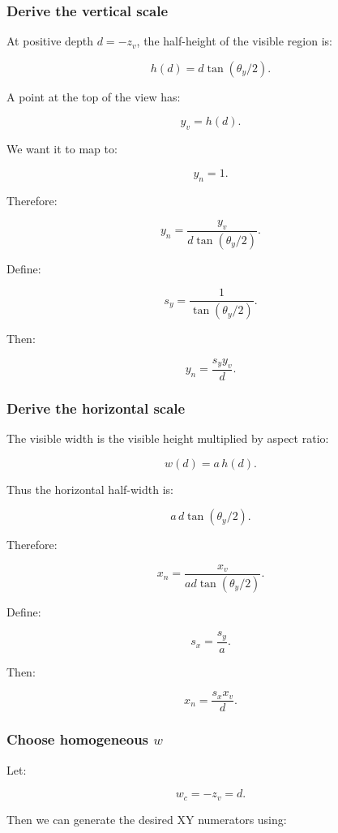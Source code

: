 \subsubsection{Derive the vertical scale}\label{derive-the-vertical-scale}

At positive depth \(d=-z_v\), the half-height of the visible region is:

\[
 h(d)=d\tan(\theta_y/2).
\]

A point at the top of the view has:

\[
 y_v=h(d).
\]

We want it to map to:

\[
 y_n=1.
\]

Therefore:

\[
 y_n= \frac{y_v}{d\tan(\theta_y/2)}.
\]

Define:

\[
 \boxed{ s_y=\frac1{\tan(\theta_y/2)} }.
\]

Then:

\[
 \boxed{ y_n=\frac{s_yy_v}{d} }.
\]

\subsubsection{Derive the horizontal scale}\label{derive-the-horizontal-scale}

The visible width is the visible height multiplied by aspect ratio:

\[
 w(d)=a\,h(d).
\]

Thus the horizontal half-width is:

\[
 a\,d\tan(\theta_y/2).
\]

Therefore:

\[
 \boxed{ x_n= \frac{x_v}{ad\tan(\theta_y/2)} }.
\]

Define:

\[
 \boxed{ s_x=\frac{s_y}{a} }.
\]

Then:

\[
 \boxed{ x_n=\frac{s_xx_v}{d} }.
\]

\subsubsection{\texorpdfstring{Choose homogeneous \(w\)}{Choose homogeneous w}}\label{choose-homogeneous-w}

Let:

\[
 \boxed{ w_c=-z_v=d }.
\]

Then we can generate the desired XY numerators using:

